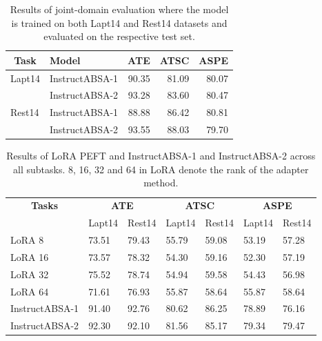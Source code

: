\documentclass[11pt]{article}
\newcommand{\name}{\textsc{I}nstruct\textsc{ABSA}\xspace}
\begin{document}
\begin{table}[t!]

\resizebox{\linewidth}{!}
{\begin{tabular}{llrrr}
\hline
\multicolumn{1}{c}{\textbf{Task}} & \textbf{Model} & \multicolumn{1}{c}{\textbf{ATE}} & \multicolumn{1}{c}{\textbf{ATSC}} & \multicolumn{1}{c}{\textbf{ASPE}} \\ \hline
\multirow{2}{*}{Lapt14} & \name{}-1 & 90.35 & 81.09   & 80.07 \\
                        & \name{}-2 & 93.28 & 83.60  & 80.47  \\ \hline
\multirow{2}{*}{Rest14} & \name{}-1 & 88.88 & 86.42  & 80.81 \\
                        & \name{}-2 & 93.55 & 88.03  & 79.70  \\ \hline
\end{tabular}}
\caption{Results of joint-domain evaluation where the model is trained on both Lapt14 and Rest14 datasets and evaluated on the respective test set.}
\label{tab:cross_domain_joint}
\end{table} 
\begin{table}[t!]
\centering
\resizebox{\columnwidth}{!}
{
\begin{tabular}{l|ll|ll|ll}
\hline
\multicolumn{1}{c|}{\multirow{2}{*}{\textbf{Tasks}}} & \multicolumn{2}{c|}{\textbf{ATE}} & \multicolumn{2}{c|}{\textbf{ATSC}} & \multicolumn{2}{c}{\textbf{ASPE}} \\ \cline{2-7} 
\multicolumn{1}{c|}{}                  & Lapt14      & Rest14     & Lapt14      & Rest14      & Lapt14      & Rest14     \\ \hline
LoRA 8                              & 73.51       & 79.43      & 55.79       & 59.08       & 53.19       & 57.28      \\
LoRA 16                             & 73.57       & 78.32      & 54.30       & 59.16       & 52.30       & 57.19      \\
LoRA 32                             & 75.52       & 78.74      & 54.94       & 59.58       & 54.43       & 56.98      \\
LoRA 64                              & 71.61       & 76.93      & 55.87       & 58.64       & 55.87       & 58.64      \\
\name{}-1    & 91.40      & 92.76            & 80.62      & 86.25      & 78.89       & 76.16            \\
\name{}-2   & 92.30            & 92.10            &81.56     & 85.17              & 79.34            & 79.47            \\ \hline
\end{tabular}
}
\caption{Results of LoRA PEFT and \name{}-1 and \name{}-2 across all subtasks. 8, 16, 32 and 64 in LoRA denote the rank of the adapter method.}
\label{tab:lora_comparison}
\end{table} 
\end{document}
